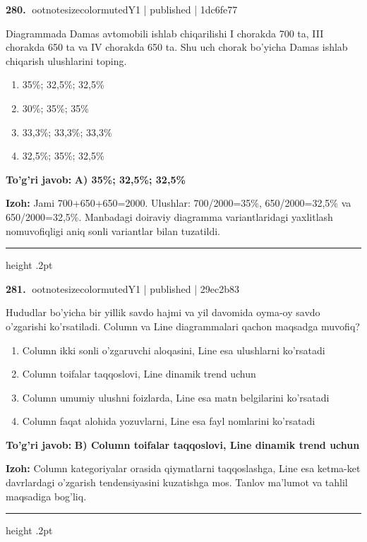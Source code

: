 \documentclass[10pt,a4paper]{article}
\begin{document}
\textbf{\color{ink}280.} {ootnotesizecolor{muted}Y1 | published | 1dc6fe77}
\par
Diagrammada Damas avtomobili ishlab chiqarilishi I chorakda 700 ta, III chorakda 650 ta va IV chorakda 650 ta. Shu uch chorak bo'yicha Damas ishlab chiqarish ulushlarini toping.
\begin{enumerate}[label=\Alph*),leftmargin=9mm]
\item 35\%; 32,5\%; 32,5\%
\item 30\%; 35\%; 35\%
\item 33,3\%; 33,3\%; 33,3\%
\item 32,5\%; 35\%; 32,5\%
\end{enumerate}
\begin{tcolorbox}[enhanced,breakable,colback=teal!4,colframe=teal!55!black,boxrule=0.45pt,arc=1.2mm,left=2.8mm,right=2.8mm,top=2mm,bottom=2mm]
\textbf{\color{teal}To'g'ri javob:} \textbf{A) 35\%; 32,5\%; 32,5\%}
\par\smallskip
\textbf{Izoh:} Jami 700+650+650=2000. Ulushlar: 700/2000=35\%, 650/2000=32,5\% va 650/2000=32,5\%. Manbadagi doiraviy diagramma variantlaridagi yaxlitlash nomuvofiqligi aniq sonli variantlar bilan tuzatildi.
\end{tcolorbox}
\vspace{2mm}\hrule height .2pt\vspace{2mm}

\textbf{\color{ink}281.} {ootnotesizecolor{muted}Y1 | published | 29ec2b83}
\par
Hududlar bo'yicha bir yillik savdo hajmi va yil davomida oyma-oy savdo o'zgarishi ko'rsatiladi. Column va Line diagrammalari qachon maqsadga muvofiq?
\begin{enumerate}[label=\Alph*),leftmargin=9mm]
\item Column ikki sonli o'zgaruvchi aloqasini, Line esa ulushlarni ko'rsatadi
\item Column toifalar taqqoslovi, Line dinamik trend uchun
\item Column umumiy ulushni foizlarda, Line esa matn belgilarini ko'rsatadi
\item Column faqat alohida yozuvlarni, Line esa fayl nomlarini ko'rsatadi
\end{enumerate}
\begin{tcolorbox}[enhanced,breakable,colback=teal!4,colframe=teal!55!black,boxrule=0.45pt,arc=1.2mm,left=2.8mm,right=2.8mm,top=2mm,bottom=2mm]
\textbf{\color{teal}To'g'ri javob:} \textbf{B) Column toifalar taqqoslovi, Line dinamik trend uchun}
\par\smallskip
\textbf{Izoh:} Column kategoriyalar orasida qiymatlarni taqqoslashga, Line esa ketma-ket davrlardagi o'zgarish tendensiyasini kuzatishga mos. Tanlov ma'lumot va tahlil maqsadiga bog'liq.
\end{tcolorbox}
\vspace{2mm}\hrule height .2pt\vspace{2mm}
\end{document}
